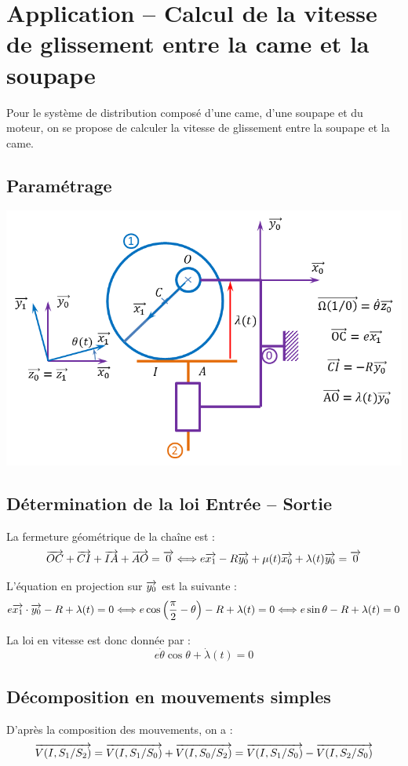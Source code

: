 \documentclass[10pt,oneside]{article}
\begin{document}

\section{Application -- Calcul de la vitesse de glissement entre la came et la soupape}
Pour le système de distribution composé d'une came, d'une soupape et du moteur, on se propose de calculer la vitesse de glissement entre la soupape et la came.
\subsection*{Paramétrage}
\begin{center}
\includegraphics[width=.7\textwidth]{png/parametrage} 
\end{center}

\subsection*{Détermination de la loi Entrée -- Sortie}
La fermeture géométrique de la chaîne est : 
$$
\overrightarrow{OC}+\overrightarrow{CI}+\overrightarrow{IA}+\overrightarrow{AO} = \overrightarrow{0} \Longleftrightarrow e\overrightarrow{x_1} -R\overrightarrow{y_0} + \mu(t)\overrightarrow{x_0}+\lambda(t) \overrightarrow{y_0} = \overrightarrow{0}
$$

L'équation en projection sur $\overrightarrow{y_0}$ est la suivante : 
$$
e\overrightarrow{x_1}\cdot \overrightarrow{y_0} -R +\lambda(t)  = 0 
\Longleftrightarrow e\cos\left(\dfrac{\pi}{2}-\theta \right) -R +\lambda(t)  = 0
\Longleftrightarrow e\sin \theta -R +\lambda(t)  = 0
$$

La loi en vitesse est donc donnée par :
$$
e\dot{\theta}\cos \theta +\dot{\lambda}(t)  = 0
$$

\subsection*{Décomposition en mouvements simples}
D'après la composition des mouvements, on a : 
$$
\overrightarrow{V(I,S_1/S_2)} = \overrightarrow{V(I,S_1/S_0)} + \overrightarrow{V(I,S_0/S_2)}
= \overrightarrow{V(I,S_1/S_0)} - \overrightarrow{V(I,S_2/S_0)}
$$
\end{document}
